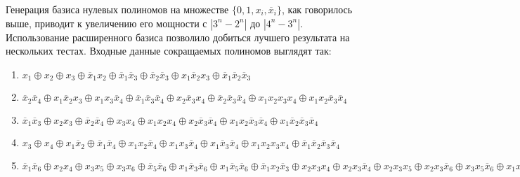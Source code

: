 \documentclass[a4paper,12pt,titlepage,finall]{article}
\begin{document}
Генерация базиса нулевых полиномов на множестве $ \{ 0, 1, x_i, \overline x_i \} $, как говорилось выше, приводит к увеличению его мощности с $ \left| 3^n - 2^n \right| $ до $ \left| 4^n - 3^n \right| $. Использование расширенного базиса позволило добиться лучшего результата на нескольких тестах. Входные данные сокращаемых полиномов выглядят так:
\begin{enumerate}
    \item $ x_1 \oplus x_2 \oplus x_3 \oplus \overline x_1 x_2 \oplus \overline x_1 \overline x_3 \oplus \overline x_2 \overline x_3 \oplus x_1 \overline x_2 x_3 \oplus \overline x_1 \overline x_2 \overline x_3 $
    \item $ \overline x_2 \overline x_4 \oplus x_1 \overline x_2 x_3 \oplus x_1 x_3 \overline x_4 \oplus \overline x_1 \overline x_3 \overline x_4 \oplus x_2 \overline x_3 x_4 \oplus \overline x_2 \overline x_3 \overline x_4 \oplus x_1 x_2 x_3 x_4 \oplus x_1 x_2 \overline x_3 \overline x_4 $
    \item $ \overline x_1 \overline x_3 \oplus x_2 x_3 \oplus \overline x_2 \overline x_4 \oplus x_3 x_4 \oplus x_1 x_2 x_4 \oplus x_2 \overline x_3 \overline x_4 \oplus x_1 x_2 \overline x_3 \overline x_4 \oplus x_1 \overline x_2 \overline x_3 \overline x_4 $
    \item $ x_3 \oplus x_4 \oplus x_1 \overline x_2 \oplus \overline x_1 \overline x_4 \oplus x_1 x_2 \overline x_4 \oplus x_1 x_3 \overline x_4 \oplus x_1 \overline x_3 \overline x_4 \oplus x_1 x_2 x_3 x_4 \oplus \overline x_1 \overline x_2 \overline x_3 \overline x_4 $
    \item $ \overline x_1 \overline x_6 \oplus x_2 x_4 \oplus x_3 x_5 \oplus x_3 x_6 \oplus \overline x_5 \overline x_6 \oplus x_1 \overline x_3 \overline x_6 \oplus x_1 \overline x_5 \overline x_6 \oplus \overline x_1 x_2 \overline x_3 \oplus x_2 x_3 x_4 \oplus x_2 x_3 \overline x_4 \oplus x_2 x_3 x_5 \oplus x_2 x_3 \overline x_6 \oplus x_3 x_5 \overline x_6 \oplus x_1 x_3 x_5 \overline x_6 \oplus \overline x_1 \overline x_3 \overline x_5 \overline x_6 \oplus x_2 x_3 x_4 x_5 \oplus x_2 \overline x_3 \overline x_5 \overline x_6 \oplus x_1 \overline x_2 x_3 \overline x_4 x_5 \overline x_6 $
\end{enumerate}
\end{document}
